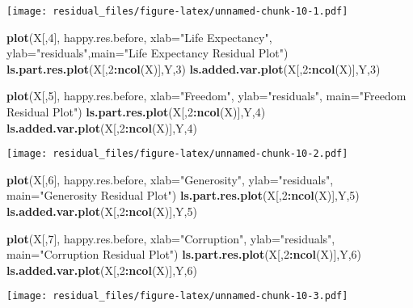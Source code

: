 \documentclass[
]{article}
\newenvironment{Shaded}{\begin{snugshade}}{\end{snugshade}}
\newcommand{\AttributeTok}[1]{\textcolor[rgb]{0.13,0.29,0.53}{#1}}
\newcommand{\DecValTok}[1]{\textcolor[rgb]{0.00,0.00,0.81}{#1}}
\newcommand{\FunctionTok}[1]{\textcolor[rgb]{0.13,0.29,0.53}{\textbf{#1}}}
\newcommand{\NormalTok}[1]{#1}
\newcommand{\SpecialCharTok}[1]{\textcolor[rgb]{0.81,0.36,0.00}{\textbf{#1}}}
\newcommand{\StringTok}[1]{\textcolor[rgb]{0.31,0.60,0.02}{#1}}
\begin{document}
\texttt{[image: residual\_files/figure-latex/unnamed-chunk-10-1.pdf]}

\begin{Shaded}
\begin{Highlighting}[]
\FunctionTok{plot}\NormalTok{(X[,}\DecValTok{4}\NormalTok{], happy.res.before, }\AttributeTok{xlab=}\StringTok{"Life Expectancy"}\NormalTok{, }\AttributeTok{ylab=}\StringTok{"residuals"}\NormalTok{,}\AttributeTok{main=}\StringTok{"Life Expectancy Residual Plot"}\NormalTok{)}
\FunctionTok{ls.part.res.plot}\NormalTok{(X[,}\DecValTok{2}\SpecialCharTok{:}\FunctionTok{ncol}\NormalTok{(X)],Y,}\DecValTok{3}\NormalTok{)}
\FunctionTok{ls.added.var.plot}\NormalTok{(X[,}\DecValTok{2}\SpecialCharTok{:}\FunctionTok{ncol}\NormalTok{(X)],Y,}\DecValTok{3}\NormalTok{)}

\FunctionTok{plot}\NormalTok{(X[,}\DecValTok{5}\NormalTok{], happy.res.before, }\AttributeTok{xlab=}\StringTok{"Freedom"}\NormalTok{, }\AttributeTok{ylab=}\StringTok{"residuals"}\NormalTok{, }\AttributeTok{main=}\StringTok{"Freedom Residual Plot"}\NormalTok{)}
\FunctionTok{ls.part.res.plot}\NormalTok{(X[,}\DecValTok{2}\SpecialCharTok{:}\FunctionTok{ncol}\NormalTok{(X)],Y,}\DecValTok{4}\NormalTok{)}
\FunctionTok{ls.added.var.plot}\NormalTok{(X[,}\DecValTok{2}\SpecialCharTok{:}\FunctionTok{ncol}\NormalTok{(X)],Y,}\DecValTok{4}\NormalTok{)}
\end{Highlighting}
\end{Shaded}

\texttt{[image: residual\_files/figure-latex/unnamed-chunk-10-2.pdf]}

\begin{Shaded}
\begin{Highlighting}[]
\FunctionTok{plot}\NormalTok{(X[,}\DecValTok{6}\NormalTok{], happy.res.before, }\AttributeTok{xlab=}\StringTok{"Generosity"}\NormalTok{, }\AttributeTok{ylab=}\StringTok{"residuals"}\NormalTok{, }\AttributeTok{main=}\StringTok{"Generosity Residual Plot"}\NormalTok{)}
\FunctionTok{ls.part.res.plot}\NormalTok{(X[,}\DecValTok{2}\SpecialCharTok{:}\FunctionTok{ncol}\NormalTok{(X)],Y,}\DecValTok{5}\NormalTok{)}
\FunctionTok{ls.added.var.plot}\NormalTok{(X[,}\DecValTok{2}\SpecialCharTok{:}\FunctionTok{ncol}\NormalTok{(X)],Y,}\DecValTok{5}\NormalTok{)}

\FunctionTok{plot}\NormalTok{(X[,}\DecValTok{7}\NormalTok{], happy.res.before, }\AttributeTok{xlab=}\StringTok{"Corruption"}\NormalTok{, }\AttributeTok{ylab=}\StringTok{"residuals"}\NormalTok{, }\AttributeTok{main=}\StringTok{"Corruption Residual Plot"}\NormalTok{)}
\FunctionTok{ls.part.res.plot}\NormalTok{(X[,}\DecValTok{2}\SpecialCharTok{:}\FunctionTok{ncol}\NormalTok{(X)],Y,}\DecValTok{6}\NormalTok{)}
\FunctionTok{ls.added.var.plot}\NormalTok{(X[,}\DecValTok{2}\SpecialCharTok{:}\FunctionTok{ncol}\NormalTok{(X)],Y,}\DecValTok{6}\NormalTok{)}
\end{Highlighting}
\end{Shaded}

\texttt{[image: residual\_files/figure-latex/unnamed-chunk-10-3.pdf]}
\end{document}
